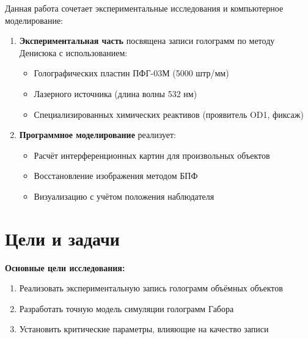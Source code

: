 \documentclass[aps,twocolumn,secnumarabic,balancelastpage,amsmath,amssymb,nofootinbib, floatfix]{revtex4-1}
\begin{document}
	Данная работа сочетает экспериментальные исследования и компьютерное моделирование:
	\begin{enumerate}
		\item \textbf{Экспериментальная часть} посвящена записи голограмм по методу Денисюка с использованием:
		\begin{itemize}
			\item Голографических пластин ПФГ-03М (5000 штр/мм)
			\item Лазерного источника (длина волны 532 нм)
			\item Специализированных химических реактивов (проявитель OD1, фиксаж)
		\end{itemize}
		\item \textbf{Программное моделирование} реализует:
		\begin{itemize}
			\item Расчёт интерференционных картин для произвольных объектов
			\item Восстановление изображения методом БПФ
			\item Визуализацию с учётом положения наблюдателя
		\end{itemize}
	\end{enumerate}
	
	\section{Цели и задачи}  
	
	\textbf{Основные цели исследования:}
	\begin{enumerate}
		\item Реализовать экспериментальную запись голограмм объёмных объектов
		\item Разработать точную модель симуляции голограмм Габора
		\item Установить критические параметры, влияющие на качество записи
	\end{enumerate}
	
\end{document}
